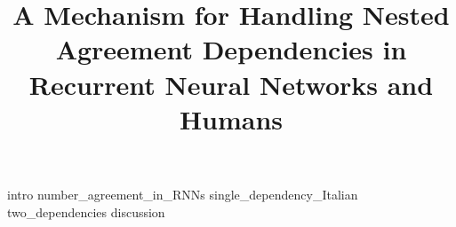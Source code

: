 \documentclass[a4paper,man,natbib, floatsintext, hidelinks]{apa7}
\title{A Mechanism for Handling Nested Agreement Dependencies in Recurrent Neural Networks and Humans}
\begin{document}
\maketitle


{intro}
{number_agreement_in_RNNs}
{single_dependency_Italian}
{two_dependencies}
{discussion}




\end{document}
